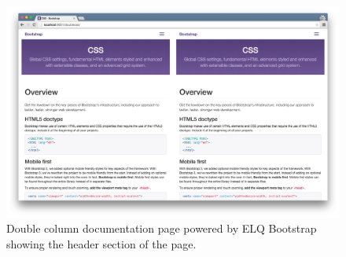 \documentclass[a4paper,11pt]{kth-mag}
\begin{document}
        \begin{figure}[htbp!]
          \centering
          \includegraphics[width=0.9\linewidth]{images/bootstrap-eq-header-small}
          \caption{Double column documentation page powered by \gls{ELQ} \gls{Bootstrap} showing the header section of the page.}
          \label{fig:appendix-bootstrap-eq-header-small}
        \end{figure}
\end{document}
